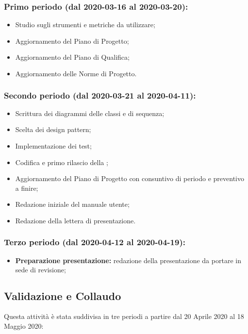 		\subsubsection{Primo periodo (dal 2020-03-16 al 2020-03-20):}
			\begin{itemize}
				\item Studio sugli strumenti e metriche da utilizzare;
			 	\item Aggiornamento del Piano di Progetto;
			 	\item Aggiornamento del Piano di Qualifica;
			 	\item Aggiornamento delle Norme di Progetto.
			\end{itemize} 	
		
		\subsubsection{Secondo periodo (dal 2020-03-21 al 2020-04-11):}
			\begin{itemize}
				\item Scrittura dei diagrammi delle classi e di sequenza;
				\item Scelta dei design pattern;
				\item Implementazione dei test;
				\item Codifica e primo rilascio della ;
				\item Aggiornamento del Piano di Progetto con consuntivo di periodo e preventivo a finire;
				\item Redazione iniziale del manuale utente;
				\item Redazione della lettera di presentazione.
			\end{itemize}

		\subsubsection{Terzo periodo (dal 2020-04-12 al 2020-04-19):}
			\begin{itemize}
				\item \textbf{Preparazione presentazione:} redazione della presentazione da portare in sede di revisione;
			\end{itemize}
	
	\subsection{Validazione e Collaudo}		
	Questa attività è stata suddivisa in tre periodi a partire dal 20 Aprile 2020 al 18 Maggio 2020:

